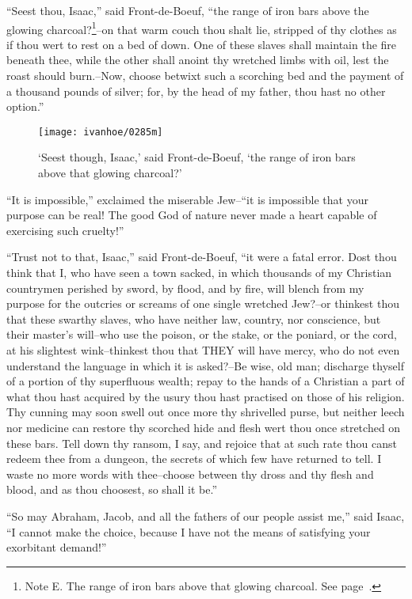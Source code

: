 ``Seest thou, Isaac,'' said Front-de-Boeuf, ``the range of iron bars
above the glowing charcoal?\footnote{Note E. The range of iron bars
above that glowing
charcoal. See page~\pageref{noteCXXII}.}--on that warm couch thou shalt
lie, stripped of thy clothes as if thou wert to rest on a bed of down.
One of these slaves shall maintain the fire beneath thee, while the
other shall anoint thy wretched limbs with oil, lest the roast should
burn.--Now, choose betwixt such a scorching bed and the payment of a
thousand pounds of silver; for, by the head of my father, thou hast no
other option.''

\begin{figure}
    \centering
    \texttt{[image: ivanhoe/0285m]}
    \caption{`Seest though, Isaac,' said Front-de-Boeuf, `the range of
    iron bars above that glowing charcoal?'}
\end{figure}

``It is impossible,'' exclaimed the miserable Jew--``it is impossible
that your purpose can be real! The good God of nature never made a heart
capable of exercising such cruelty!''

``Trust not to that, Isaac,'' said Front-de-Boeuf, ``it were a fatal
error. Dost thou think that I, who have seen a town sacked, in which
thousands of my Christian countrymen perished by sword, by flood, and by
fire, will blench from my purpose for the outcries or screams of one
single wretched Jew?--or thinkest thou that these swarthy slaves, who
have neither law, country, nor conscience, but their master's will--who
use the poison, or the stake, or the poniard, or the cord, at his
slightest wink--thinkest thou that THEY will have mercy, who do not even
understand the language in which it is asked?--Be wise, old man;
discharge thyself of a portion of thy superfluous wealth; repay to the
hands of a Christian a part of what thou hast acquired by the usury thou
hast practised on those of his religion. Thy cunning may soon swell out
once more thy shrivelled purse, but neither leech nor medicine can
restore thy scorched hide and flesh wert thou once stretched on these
bars. Tell down thy ransom, I say, and rejoice that at such rate thou
canst redeem thee from a dungeon, the secrets of which few have returned
to tell. I waste no more words with thee--choose between thy dross and
thy flesh and blood, and as thou choosest, so shall it be.''

``So may Abraham, Jacob, and all the fathers of our people assist me,''
said Isaac, ``I cannot make the choice, because I have not the means of
satisfying your exorbitant demand!''

